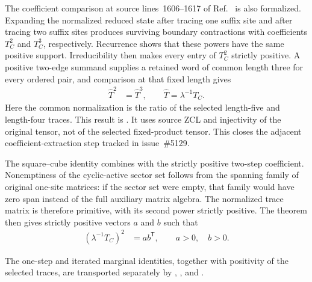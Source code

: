 \documentclass{article}
\begin{document}
The coefficient comparison at source lines~1606--1617 of
Ref.~\cite{Cirac2016MPDO_arXiv} is also formalized. Expanding the normalized
reduced state after tracing one suffix site and after tracing two suffix sites
produces surviving boundary contractions with coefficients $T_C^2$ and
$T_C^3$, respectively. Recurrence shows that these powers have the same
positive support. Irreducibility then makes every entry of $T_C^2$ strictly
positive. A positive two-edge summand supplies a retained word of common
length three for every ordered pair, and comparison at that fixed length gives
\begin{align}
    \widehat T^2
        &=\widehat T^3,
    \qquad
    \widehat T=\lambda^{-1}T_C.
    \label{eq:cpsv16_commuting_form_to_sal_selected_trace_square_cube}
\end{align}
Here the common normalization is the ratio of the selected length-five and
length-four traces. This result is
.
It uses source ZCL and injectivity of the original tensor, not of the selected
fixed-product tensor. This closes the adjacent coefficient-extraction step
tracked in issue~\#5129.

The square--cube identity combines with the strictly positive two-step
coefficient. Nonemptiness of the cyclic-active sector set follows from the
spanning family of original one-site matrices: if the sector set were empty,
that family would have zero span instead of the full auxiliary matrix algebra.
The normalized trace matrix is therefore primitive, with its second power
strictly positive. The theorem
then gives strictly positive vectors $a$ and $b$ such that
\begin{align}
    (\lambda^{-1}T_C)^2
        &=ab^{\mathsf T},
    \qquad a>0,\quad b>0.
    \label{eq:cpsv16_commuting_form_to_sal_positive_two_step_rank_one}
\end{align}

The one-step and iterated marginal identities, together with positivity of the
selected traces, are transported separately by
,
,
and
.
\end{document}
